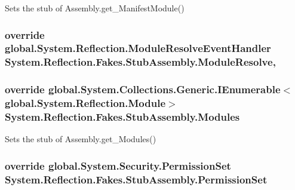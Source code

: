 Sets the stub of Assembly.\-get\-\_\-\-Manifest\-Module()

\hypertarget{class_system_1_1_reflection_1_1_fakes_1_1_stub_assembly_a6f09680b54c1b0e33454e34b5799ff62}{
\subsubsection[{Module\-Resolve}]{\setlength{\rightskip}{0pt plus 5cm}override global.\-System.\-Reflection.\-Module\-Resolve\-Event\-Handler System.\-Reflection.\-Fakes.\-Stub\-Assembly.\-Module\-Resolve\hspace{0.3cm}{\ttfamily [add]}, {\ttfamily [remove]}}}\label{class_system_1_1_reflection_1_1_fakes_1_1_stub_assembly_a6f09680b54c1b0e33454e34b5799ff62}
\hypertarget{class_system_1_1_reflection_1_1_fakes_1_1_stub_assembly_ad98823ef984c6e1d729ceb4e24999441}{
\subsubsection[{Modules}]{\setlength{\rightskip}{0pt plus 5cm}override global.\-System.\-Collections.\-Generic.\-I\-Enumerable$<$global.\-System.\-Reflection.\-Module$>$ System.\-Reflection.\-Fakes.\-Stub\-Assembly.\-Modules\hspace{0.3cm}{\ttfamily [get]}}}\label{class_system_1_1_reflection_1_1_fakes_1_1_stub_assembly_ad98823ef984c6e1d729ceb4e24999441}


Sets the stub of Assembly.\-get\-\_\-\-Modules()

\hypertarget{class_system_1_1_reflection_1_1_fakes_1_1_stub_assembly_a14f943b9584c6b4271dd08d098c1a74c}{
\subsubsection[{Permission\-Set}]{\setlength{\rightskip}{0pt plus 5cm}override global.\-System.\-Security.\-Permission\-Set System.\-Reflection.\-Fakes.\-Stub\-Assembly.\-Permission\-Set\hspace{0.3cm}{\ttfamily [get]}}}\label{class_system_1_1_reflection_1_1_fakes_1_1_stub_assembly_a14f943b9584c6b4271dd08d098c1a74c}


